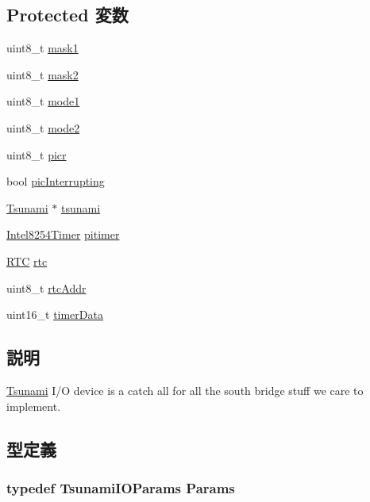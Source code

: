 \subsection*{Protected 変数}
\begin{DoxyCompactItemize}
\item 
uint8\_\-t \hyperlink{classTsunamiIO_adaf4809f6b77e7cde58780f5f451a6e4}{mask1}
\item 
uint8\_\-t \hyperlink{classTsunamiIO_a474e49c245ff8b6dc57653a9cd7f64dc}{mask2}
\item 
uint8\_\-t \hyperlink{classTsunamiIO_a9237c26b42f96e5e4ad44839abdf85ce}{mode1}
\item 
uint8\_\-t \hyperlink{classTsunamiIO_af51e3a81fa6352c9fbc24d5bc03d843f}{mode2}
\item 
uint8\_\-t \hyperlink{classTsunamiIO_a8472e2cd6c519d77f7b7ab878a42fa40}{picr}
\item 
bool \hyperlink{classTsunamiIO_ab72d9ca48cf8b7b897799490833c4b5e}{picInterrupting}
\item 
\hyperlink{classTsunami}{Tsunami} $\ast$ \hyperlink{classTsunamiIO_aa178467f241f875a068722413f62ec20}{tsunami}
\item 
\hyperlink{classIntel8254Timer}{Intel8254Timer} \hyperlink{classTsunamiIO_a0447f4b0ded66f26d3ce882c29d1125e}{pitimer}
\item 
\hyperlink{classTsunamiIO_1_1RTC}{RTC} \hyperlink{classTsunamiIO_afa7e240c7456eaf5ef27ee8be3a23bd4}{rtc}
\item 
uint8\_\-t \hyperlink{classTsunamiIO_a4603c0adbe60021db8e6d488b0366d75}{rtcAddr}
\item 
uint16\_\-t \hyperlink{classTsunamiIO_ac2f6e48e9ea7cdd01d0d4855725107d6}{timerData}
\end{DoxyCompactItemize}


\subsection{説明}
\hyperlink{classTsunami}{Tsunami} I/O device is a catch all for all the south bridge stuff we care to implement. 

\subsection{型定義}
\hypertarget{classTsunamiIO_a46efefdf21511fe3655f4589444a8479}{
\subsubsection[{Params}]{\setlength{\rightskip}{0pt plus 5cm}typedef TsunamiIOParams {\bf Params}}}
\label{classTsunamiIO_a46efefdf21511fe3655f4589444a8479}


